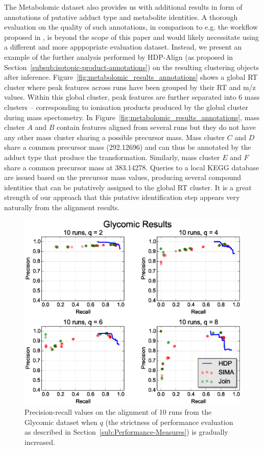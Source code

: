 The Metabolomic dataset also provides us with additional results in form of annotations of putative adduct type and metabolite identities. A thorough evaluation on the quality of such annotations, in comparison to e.g. the workflow proposed in \cite{Lee2013}, is beyond the scope of this paper and would likely necessitate using a different and more apppopriate evaluation dataset. Instead, we present an example of the further analysis performed by HDP-Align (as proposed in Section~\ref{subsub:isotopic-product-annotations}) on the resulting clustering objects after inference. Figure~\ref{fig:metabolomic_results_annotations} shows a global \ac{RT} cluster where peak features across runs have been grouped by their \ac{RT} and m/z values. Within this global cluster, peak features are further separated into 6 mass clusters -- corresponding to ionisation products produced by the global cluster during mass spectometry. In Figure~\ref{fig:metabolomic_results_annotations}, mass cluster $A$ and $B$ contain features aligned from several runs but they do not have any other mass cluster sharing a possible precursor mass. Mass cluster $C$ and $D$ share a common precursor mass (292.12696) and can thus be annotated by the adduct type that produce the transformation. Similarly, mass cluster $E$ and $F$ share a common precursor mass at 383.14278. Queries to a local KEGG database are issued based on the precursor mass values, producing several compound identities that can be putatively assigned to the global \ac{RT} cluster. It is a great strength of our approach that this putative identification step appears very naturally from the alignment results.

\begin{figure}
\centering\includegraphics[width=1\columnwidth]{05-hdp/figures/figure_5.eps}
\centering\caption{\label{fig:glycomic_results}Precision-recall values on the alignment of 10 runs from the Glycomic dataset when $q$ (the strictness of performance evaluation as described in Section~\ref{sub:Performance-Measures}) is gradually increased.}
\end{figure}

